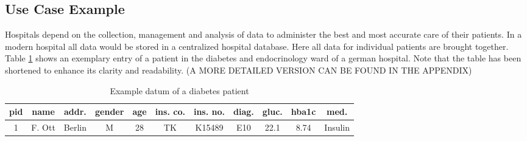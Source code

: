 \subsection{Use Case Example}
Hospitals depend on the collection, management and analysis of data to administer the best and most accurate care of their patients. In a modern hospital all data would be stored in a centralized hospital database. 
Here all data for individual patients are brought together. Table \ref{table:dia_patient} shows an exemplary entry of a patient in the diabetes and endocrinology ward of a german hospital. Note that the table has been shortened to enhance its clarity and readability.  (A MORE DETAILED VERSION CAN BE FOUND IN THE APPENDIX)


\bigskip 


\begin{table}[ht]
    \begin{center}
    \footnotesize{
        \renewcommand{\arraystretch}{1.5}
        \begin{tabular}{ | c | c | c | c | c | c | c | c | c | c | c | } 
            \hline
            pid & name & addr. & gender & age & ins. co. & ins. no. & diag. & gluc. & hba1c & med. \\
            \hline
            1 & F. Ott & Berlin & M & 28 & TK & K15489 & E10 & 22.1 & 8.74 & Insulin \\
            \hline
        \end{tabular}
    }
    \caption{Example datum of a diabetes patient}
    \label{table:dia_patient}
    \end{center}
\end{table}

